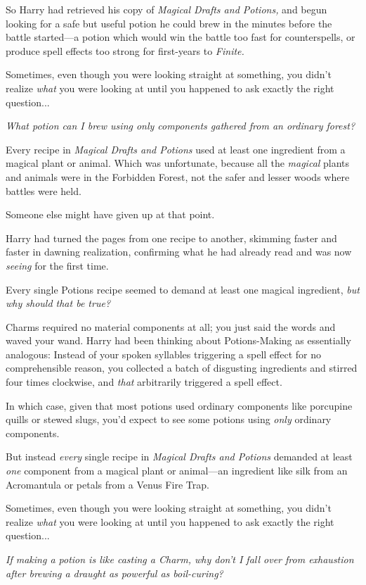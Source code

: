 So Harry had retrieved his copy of \emph{Magical Drafts and
Potions,} and begun looking for a safe but useful potion he
could brew in the minutes before the battle started—a potion
which would win the battle too fast for counterspells, or produce
spell effects too strong for first-years to \emph{Finite.}

Sometimes, even though you were looking straight at something,
you didn’t realize \emph{what} you were looking at until you
happened to ask exactly the right question...

\emph{What potion can I brew using only components gathered from an
ordinary forest?}

Every recipe in \emph{Magical Drafts and Potions} used at least
one ingredient from a magical plant or animal. Which was
unfortunate, because all the \emph{magical} plants and animals were
in the Forbidden Forest, not the safer and lesser woods where
battles were held.

Someone else might have given up at that point.

Harry had turned the pages from one recipe to another, skimming
faster and faster in dawning realization, confirming what he had
already read and was now \emph{seeing} for the first time.

Every single Potions recipe seemed to demand at least one
magical ingredient, \emph{but why should that be true?}

Charms required no material components at all; you just said the
words and waved your wand. Harry had been thinking about
Potions-Making as essentially analogous: Instead of your spoken
syllables triggering a spell effect for no comprehensible reason,
you collected a batch of disgusting ingredients and stirred four
times clockwise, and \emph{that} arbitrarily triggered a spell
effect.

In which case, given that most potions used ordinary components
like porcupine quills or stewed slugs, you’d expect to see some
potions using \emph{only} ordinary components.

But instead \emph{every} single recipe in \emph{Magical Drafts and
Potions} demanded at least \emph{one} component from a magical
plant or animal—an ingredient like silk from an Acromantula or
petals from a Venus Fire Trap.

Sometimes, even though you were looking straight at something,
you didn’t realize \emph{what} you were looking at until you
happened to ask exactly the right question...

\emph{If making a potion is like casting a Charm, why don’t I fall
over from exhaustion after brewing a draught as powerful as
boil-curing?}

